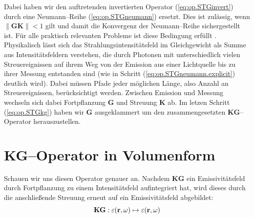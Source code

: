 	Dabei haben wir den auftretenden invertierten Operator (\ref{eq:op.STGinvert}) durch eine Neumann--Reihe (\ref{eq:op.STGneumann}) ersetzt. Dies ist zulässig, wenn $\|\mathbf{GK}\|<1$ gilt und damit die Konvergenz der Neumann--Reihe sichergestellt ist. Für alle praktisch relevanten Probleme ist diese Bedingung erfüllt \citep[s.][Theorem 12 und 13]{Arvo:1995p9257}. Physikalisch lässt sich das Strahlungsintensitätsfeld im Gleichgewicht als Summe aus Intensitätsfeldern verstehen, die durch Photonen mit unterschiedlich vielen Streuereignissen auf ihrem Weg von der Emission aus einer Lichtquelle bis zu ihrer Messung entstanden sind (wie in Schritt (\ref{eq:op.STGneumann.explicit}) deutlich wird). Dabei müssen Pfade jeder möglichen Länge, also Anzahl an Streuereignissen, berücksichtigt werden. Zwischen Emission und Messung wechseln sich dabei Fortpflanzung $\mathbf{G}$ und Streuung $\mathbf{K}$ ab. Im letzen Schritt (\ref{eq:op.STGkg}) haben wir $\mathbf{G}$ ausgeklammert um den zusammengesetzten $\mathbf{KG}$--Operator herauszustellen.
	
	
	\section{KG--Operator in Volumenform}
	Schauen wir uns diesen Operator genauer an. Nachdem $\mathbf{KG}$ ein Emissivitätsfeld durch Fortpflanzung zu einem Intensitätsfeld aufintegriert hat, wird dieses durch die anschließende Streuung erneut auf ein Emissivitätsfeld abgebildet:
	\begin{equation*}
		\mathbf{KG} : \varepsilon(\mathbf{r},\omega) \mapsto \varepsilon(\mathbf{r},\omega)
	\end{equation*}

